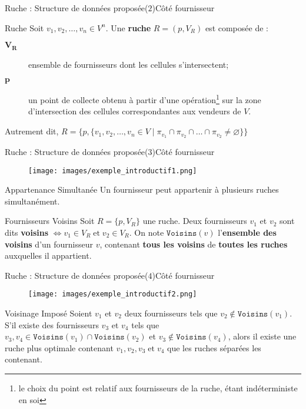 \documentclass[usenames,dvipsnames]{beamer}
\begin{document}
\begin{frame}{Ruche : Structure de données proposée($2$)}{Côté fournisseur}
\begin{block}{Ruche}
Soit $v_1, v_2, \dots, v_n \in V^n$. Une \textbf{ruche} $R = (p, V_R)$ est composée de :
\begin{description}
  \item[$\mathbf{V_R}$]{ensemble de fournisseurs dont les cellules s'intersectent;}
  \item[$\mathbf{p}$]{un point de collecte obtenu à partir d'une opération\footnote{le choix du point est relatif aux fournisseurs de la ruche, étant indéterministe en soi} sur la zone d'intersection des cellules correspondantes aux vendeurs de $V$.}
\end{description}
Autrement dit, $R = \{p, \{v_1, v_2, \dots, v_n \in V\; |\; \pi_{v_1} \cap \pi_{v_2} \cap \dots \cap \pi_{v_2} \neq \varnothing\}\}$
\end{block}
\end{frame}

\begin{frame}{Ruche : Structure de données proposée($3$)}{Côté fournisseur}
\begin{figure}[!ht]
  \centering
  \texttt{[image: images/exemple\_introductif1.png]}
\end{figure}

\begin{block}{Appartenance Simultanée}
Un fournisseur peut appartenir à plusieurs ruches simultanément.
\end{block}

\begin{block}{Fournisseurs Voisins}
Soit $R = \{p, V_R\}$ une ruche. Deux fournisseurs $v_1$ et $v_2$ sont dits \textbf{voisins} $\iff v_1 \in V_R\; \text{et}\; v_2 \in V_R$. On note $\texttt{Voisins}(v)$ l'\textbf{ensemble des voisins} d'un fournisseur $v$, contenant \textbf{tous les voisins} de \textbf{toutes les ruches} auxquelles il appartient.
\end{block}
\end{frame}

\begin{frame}{Ruche : Structure de données proposée($4$)}{Côté fournisseur}
\begin{figure}[!ht]
  \centering
  \texttt{[image: images/exemple\_introductif2.png]}
\end{figure}

\begin{block}{Voisinage Imposé}
Soient $v_1$ et $v_2$ deux fournisseurs tels que $v_2 \notin \texttt{Voisins}(v_1)$. S'il existe des fournisseurs $v_3$ et $v_4$ tels que $v_3, v_4 \in \texttt{Voisins}(v_1) \cap \texttt{Voisins}(v_2)$ et $v_3 \notin \texttt{Voisins}(v_4)$, alors il existe une ruche plus optimale contenant $v_1, v_2, v_3\; \text{et}\; v_4$ que les ruches séparées les contenant.
\end{block}
\end{frame}
\end{document}
